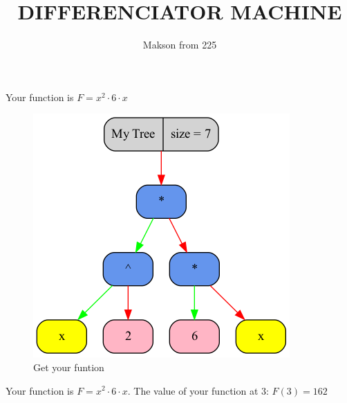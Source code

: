 \documentclass[12pt, letterpaper, twoside]{article}
\title{DIFFERENCIATOR MACHINE}
\author{Makson from 225}
\date{}
\begin{document}
\maketitle
\newpage
\begin{center}
Your function is $F = x^{2} \cdot 6 \cdot x$\newline 
\begin{figure}
\begin{center}
\includegraphics [scale = 0.4]{graphics/graph1.png}
\caption{Get your funtion}
\end{center}
\end{figure}
\end{center}
\newpage
Your function is $F = x^{2} \cdot 6 \cdot x$.
The value of your function at 3: $ F(3) = 162 $
\end{document}

